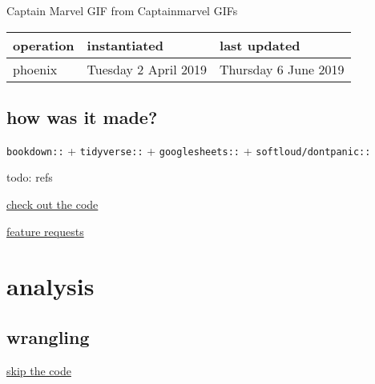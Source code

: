\documentclass[]{book}
\newenvironment{Shaded}{\begin{snugshade}}{\end{snugshade}}
\newcommand{\CommentTok}[1]{\textcolor[rgb]{0.56,0.35,0.01}{\textit{#1}}}
\newcommand{\DataTypeTok}[1]{\textcolor[rgb]{0.13,0.29,0.53}{#1}}
\newcommand{\KeywordTok}[1]{\textcolor[rgb]{0.13,0.29,0.53}{\textbf{#1}}}
\newcommand{\NormalTok}[1]{#1}
\newcommand{\OperatorTok}[1]{\textcolor[rgb]{0.81,0.36,0.00}{\textbf{#1}}}
\newcommand{\StringTok}[1]{\textcolor[rgb]{0.31,0.60,0.02}{#1}}
\begin{document}
Captain Marvel GIF from Captainmarvel GIFs

\begin{longtable}[]{@{}lll@{}}
\toprule
operation & instantiated & last updated\tabularnewline
\midrule
\endhead
phoenix & Tuesday 2 April 2019 & Thursday 6 June 2019\tabularnewline
\bottomrule
\end{longtable}

\hypertarget{how-was-it-made}{%
\section{how was it made?}\label{how-was-it-made}}

\texttt{bookdown::} + \texttt{tidyverse::} + \texttt{googlesheets::} + \texttt{softloud/dontpanic::}

todo: refs

\href{https://github.com/softloud/lifeswork}{check out the code}

\href{https://github.com/softloud/lifeswork/issues}{feature requests}

\hypertarget{analysis}{%
\chapter{analysis}\label{analysis}}

\hypertarget{wrangling}{%
\section{wrangling}\label{wrangling}}

\href{}{skip the code}

\begin{Shaded}
\end{Shaded}
\end{document}
